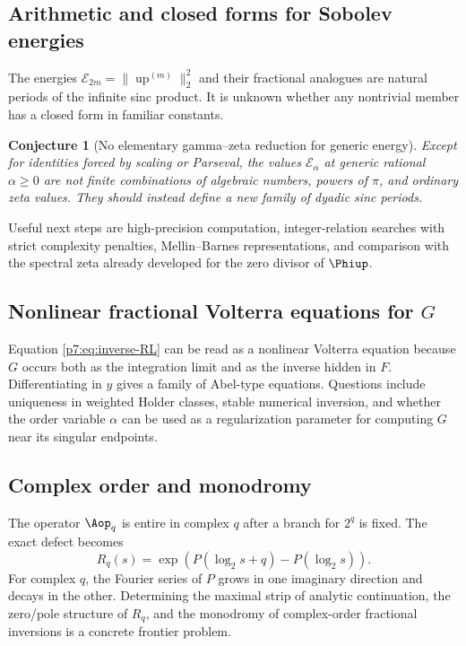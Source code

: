 \documentclass[11pt,oneside]{article}
\newtheorem{conjecture}[theorem]{Conjecture}
\theoremstyle{definition}
\theoremstyle{remark}
\newcommand{\Up}{\operatorname{up}}
\newcommand{\1}{\mathbf 1}
\begin{document}
\subsection{Arithmetic and closed forms for Sobolev energies}

The energies $\mathcal E_{2m}=\|\Up^{(m)}\|_2^2$ and their fractional analogues are natural
periods of the infinite sinc product.  It is unknown whether any nontrivial member has a
closed form in familiar constants.

\begin{conjecture}[No elementary gamma--zeta reduction for generic energy]
Except for identities forced by scaling or Parseval, the values $\mathcal E_\alpha$ at generic
rational $\alpha\ge0$ are not finite combinations of algebraic numbers, powers of $\pi$, and
ordinary zeta values.  They should instead define a new family of dyadic sinc periods.
\statusopen
\end{conjecture}

Useful next steps are high-precision computation, integer-relation searches with strict
complexity penalties, Mellin--Barnes representations, and comparison with the spectral zeta
already developed for the zero divisor of $\Phiup$.

\subsection{Nonlinear fractional Volterra equations for $G$}

Equation \cref{p7:eq:inverse-RL} can be read as a nonlinear Volterra equation because $G$ occurs
both as the integration limit and as the inverse hidden in $F$.  Differentiating in $y$ gives a
family of Abel-type equations.  Questions include uniqueness in weighted Holder classes,
stable numerical inversion, and whether the order variable $\alpha$ can be used as a
regularization parameter for computing $G$ near its singular endpoints.

\subsection{Complex order and monodromy}

The operator $\Aop_q$ is entire in complex $q$ after a branch for $2^q$ is fixed.  The exact
defect becomes
\[
 R_q(s)=\exp(P(\log_2s+q)-P(\log_2s)).
\]
For complex $q$, the Fourier series of $P$ grows in one imaginary direction and decays in the
other.  Determining the maximal strip of analytic continuation, the zero/pole structure of
$R_q$, and the monodromy of complex-order fractional inversions is a concrete frontier
problem.
\end{document}
